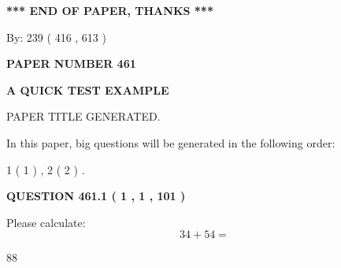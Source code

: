 \documentclass[12pt]{article}
\begin{document}
   
   
   
\vspace{1.0in} 
{\textbf{\large{ *** END OF PAPER, THANKS *** }}} 
   
   
\hspace{1.0in} By: 
 239 ( 416 ,  613 )
   
   
   
   
\newpage 
\setcounter{page}{ 
   461001 } 
   
   
   
   
 {\textbf{ \Large{ PAPER NUMBER  461  }}}
   
   
\vspace{0.2in}
   
   
   
   
   
   
   
   
 \vspace{0.2in}
{\LARGE {\textbf{ A QUICK TEST EXAMPLE}}}
   
   
 PAPER TITLE GENERATED.
   
   
   
\vspace{0.2in}
   
In this paper, big questions will be generated in the following order: 
   
   
   1 ( 1 )
 ,
   2 ( 2 )
 .
  
\vspace{0.2in}
  
{\textbf{\Large{QUESTION
461.1 
 ( 1 , 1 , 101 )
}}}
  
  
 
Please calculate:
\begin{equation}
34 +  %
54 = \nonumber
\end{equation}
 
 
 
\noindent{}
 
 

88
 
 
\noindent{}
 
 

 
 
 
\noindent{}
 
\end{document}

